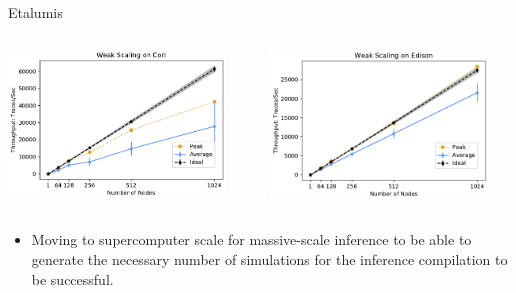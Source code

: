 \documentclass[AERbeamer%
              ,optEnglish%
              ,optBiber%
              ,optBibstyleAlphabetic%
              ,optBeamerClassicFormat%
              ]{AERlatex}%
\begin{document}
\begin{frame}[c]{Etalumis}
    \centering
    \begin{columns}[T]
        \begin{column}{0.48\textwidth}
            \centering
            \includegraphics[width=0.9\textwidth]{EtalumisScalingCori.png}
        \end{column}
        \begin{column}{0.48\textwidth}
            \centering
            \includegraphics[width=0.9\textwidth]{EtalumisScalingEdison.png}
        \end{column}
    \end{columns}
    \vspace{1cm}
    \begin{itemize}
        \item Moving to supercomputer scale for massive-scale inference to be able to generate the necessary
              number of simulations for the inference compilation to be successful.
    \end{itemize}
\end{frame}
\end{document}
